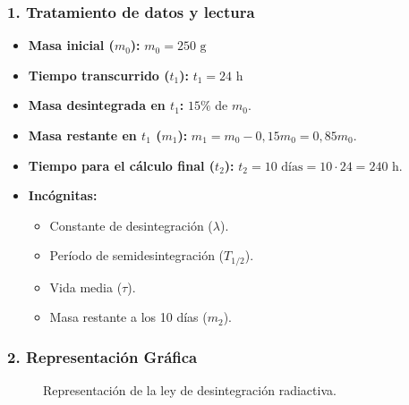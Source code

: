 \subsubsection*{1. Tratamiento de datos y lectura}
\begin{itemize}
    \item \textbf{Masa inicial ($m_0$):} $m_0 = 250 \text{ g}$
    \item \textbf{Tiempo transcurrido ($t_1$):} $t_1 = 24 \text{ h}$
    \item \textbf{Masa desintegrada en $t_1$:} $15\%$ de $m_0$.
    \item \textbf{Masa restante en $t_1$ ($m_1$):} $m_1 = m_0 - 0,15 m_0 = 0,85 m_0$.
    \item \textbf{Tiempo para el cálculo final ($t_2$):} $t_2 = 10 \text{ días} = 10 \cdot 24 = 240 \text{ h}$.
    \item \textbf{Incógnitas:}
    \begin{itemize}
        \item Constante de desintegración ($\lambda$).
        \item Período de semidesintegración ($T_{1/2}$).
        \item Vida media ($\tau$).
        \item Masa restante a los 10 días ($m_2$).
    \end{itemize}
\end{itemize}

\subsubsection*{2. Representación Gráfica}
\begin{figure}[H]
    \centering
    \caption{Representación de la ley de desintegración radiactiva.}
\end{figure}

